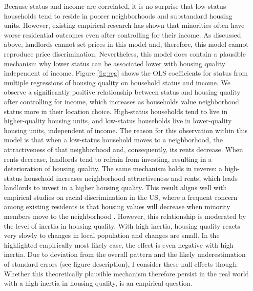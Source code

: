 Because status and income are correlated, it is no surprise that low-status households tend to reside in poorer neighborhoods and substandard housing units. However, existing empirical research has shown that minorities often have worse residential outcomes even after controlling for their income. As discussed above, landlords cannot set prices in this model and, therefore, this model cannot reproduce price discrimination. Nevertheless, this model does contain a plausible mechanism why lower status can be associated lower with housing quality independent of income. Figure \ref{fig:reg} shows the OLS coefficients for status from multiple regressions of housing quality on household status and income. We observe a significantly positive relationship between status and housing quality after controlling for income, which increases as households value neighborhood status more in their location choice. High-status households tend to live in higher-quality housing units, and low-status households live in lower-quality housing units, independent of income. The reason for this observation within this model is that when a low-status household moves to a neighborhood, the attractiveness of that neighborhood and, consequently, its rents decrease. When rents decrease, landlords tend to refrain from investing, resulting in a deterioration of housing quality. The same mechanism holds in reverse: a high-status household increases neighborhood attractiveness and rents, which leads landlords to invest in a higher housing quality. This result aligns well with empirical studies on racial discrimination in the US, where a frequent concern among existing residents is that housing values will decrease when minority members move to the neighborhood \citep{harrisPropertyValuesDrop1999, krysanDoesRaceMatter2009}. However, this relationship is moderated by the level of inertia in housing quality. With high inertia, housing quality reacts very slowly to changes in local population and changes are small. In the highlighted empirically most likely case, the effect is even negative with high inertia. Due to deviation from the overall pattern and the likely underestimation of standard errors (see figure description), I consider these null effects though. Whether this theoretically plausible mechanism therefore persist in the real world with a high inertia in housing quality, is an empirical question.


